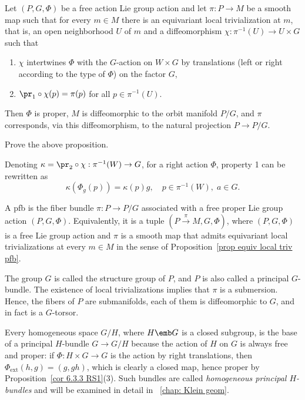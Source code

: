 \begin{prop}\label{prop equiv local triv pfb}
    Let $(P,G,\Phi)$  be a free action Lie group action and let $\pi:P\to M$ be a smooth map such that for every $m\in M$ there is an equivariant local trivialization at $m$, that is, an open neighborhood $U$ of $m$ and a diffeomorphism $\chi:\pi^{-1}(U)\to U\times G$ such that
    \begin{enumerate}
        \item $\chi$ intertwines $\Phi$ with the $G$-action on $W\times G$ by translations (left or right according to the type of $\Phi$) on the factor $G$,
        \item $\pr_1\circ \chi(p)=\pi(p)$ for all $p\in\pi^{-1}(U)$.
    \end{enumerate}
    Then $\Phi$ is proper, $M$ is diffeomorphic to the orbit manifold $P\slash G$, and $\pi$ corresponds, via this diffeomorphism, to the natural projection $P\to P\slash G$.
\end{prop}

\begin{xca}
    Prove the above proposition.
\end{xca}

Denoting $\kappa=\pr_2\circ\chi :\pi^{-1}(W)\to G$, for a right action $\Phi$, property 1 can be rewritten as 
\[\kappa\left(\Phi_g(p)\right)=\kappa(p)g,\quad p\in\pi^{-1}(W),\; a\in G.\]


\begin{defn}\label{def pfb}
    A \gls{pfb} is the fiber bundle $\pi:P\to P\slash G$ associated with a free proper Lie group action $(P,G,\Phi)$. Equivalently, it is a tuple $(P\overset{\pi}{\to}M,G,\Phi)$, where $(P,G,\Phi)$ is a free Lie group action and $\pi$ is a smooth map that admits equivariant local trivializations at every $m\in M$ in the sense of Proposition~\ref{prop equiv local triv pfb}.

    The group $G$ is called the structure group of $P$, and $P$ is also called a principal $G$-bundle. The existence of local trivializations implies that $\pi$ is a submersion. Hence, the fibers of $P$ are submanifolds, each of them is diffeomorphic to $G$, and in fact is a $G$-torsor.
\end{defn}


\begin{example}\label{ex homogeneous principal bundles}
    Every homogeneous space $G\slash H$, where $H\emb G$ is a closed subgroup, is the base of a principal $H$-bundle  $G\to G\slash H$ because the action of $H$ on $G$ is always free and proper: if $\Phi:H\times G\to G$ is the action by right translations, then $\Phi_{\mathrm{ext}}(h,g)=(g,gh)$, which is clearly a closed map, hence proper by Proposition~\ref{cor 6.3.3 RS1}(3). Such bundles are called \emph{homogeneous principal $H$-bundles} and will be examined in detail in \Chap~\ref{chap: Klein geom}.
\end{example}


